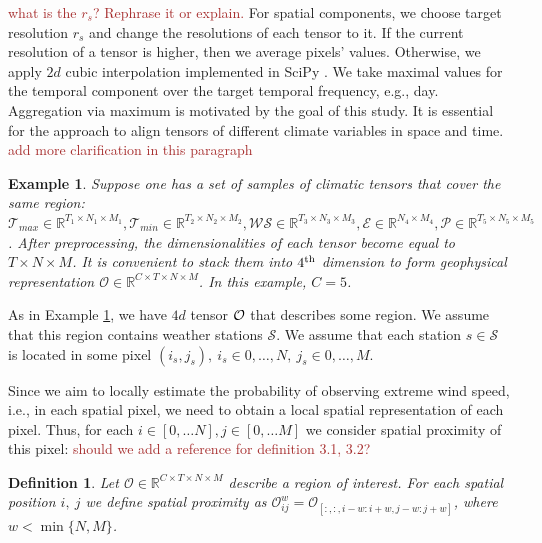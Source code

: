 \documentclass{article}
\newtheorem{example}{Example}
\newtheorem{definition}{Definition}[section]
\begin{document}
\textcolor{brown}{what is the $r_s$? Rephrase it or explain.} For spatial components, we choose target resolution $r_s$ and change the resolutions of each tensor to it. If the current resolution of a tensor is higher, then we average pixels' values. Otherwise, we apply $2d$ cubic interpolation implemented in SciPy \cite{2020SciPy-NMeth}. 
We take maximal values for the temporal component over the target temporal frequency, e.g., day. Aggregation via maximum is motivated by the goal of this study. It is essential for the approach to align tensors of different climate variables in space and time. \textcolor{brown}{add more clarification in this paragraph}


\begin{example}
\label{example:O}
Suppose one has a set of samples of climatic tensors that cover the same region: $\mathcal{T}_{max} \in \mathbb{R}^{T_1 \times N_1\times M_1}, \mathcal{T}_{min} \in \mathbb{R}^{T_2\times N_2\times M_2}, \mathcal{WS} \in \mathbb{R}^{T_3\times N_3\times M_3}, \mathcal{E} \in \mathbb{R}^{N_4\times M_4}, \mathcal{P} \in \mathbb{R}^{T_5\times N_5\times M_5}$. After preprocessing, the dimensionalities of each tensor become equal to $T \times N \times M$.
It is convenient to stack them into $4^{\textup{th}}$ dimension to form geophysical representation  $\mathcal{O} \in \mathbb{R}^{C \times T \times N \times M}$. In this example, $C = 5$.
\end{example}

As in Example \ref{example:O}, we have $4d$ tensor $\cal{O}$ that describes some region. We assume that this region contains weather stations $\mathcal{S}$. We assume that each station $s \in \mathcal{S}$ is located in some pixel $(i_s, j_s), ~ i_s \in {0, \dots, N}, ~ j_s \in {0, \dots, M}$. 

Since we aim to locally estimate the probability of observing extreme wind speed, i.e., in each spatial pixel, we need to obtain a local spatial representation of each pixel. Thus, for each $i \in [0, \dots N], j \in [0, \dots M]$ we consider spatial proximity of this pixel: \textcolor{brown}{should we add a reference for definition 3.1, 3.2?}

\begin{definition}
\label{def:spatial_vicinity}
Let $\mathcal{O} \in \mathbb{R}^{C \times T \times N \times M}$ describe a region of interest. For each spatial position $i,\ j$ we define spatial proximity as $\mathcal{O}^w_{ij} = \mathcal{O}_{[:, :, i - w : i + w, j - w:j + w]}$, where $w < \min \{N, M\}$. 
\end{definition}
\end{document}
